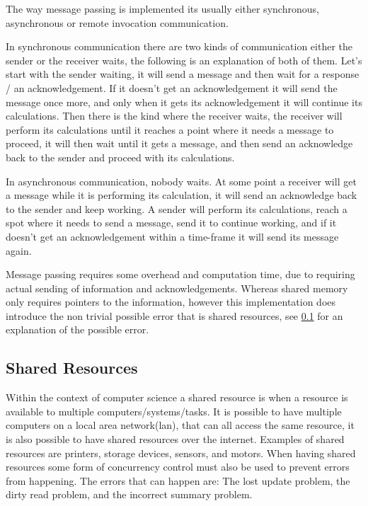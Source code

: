 The way message passing is implemented its usually either synchronous, asynchronous or remote invocation communication. 

In synchronous communication there are two kinds of communication either the sender or the receiver waits, the following is an explanation of both of them.
Let's start with the sender waiting, it will send a message and then wait for a response / an acknowledgement. If it doesn't get an acknowledgement it will send the message once more, and only when it gets its acknowledgement it will continue its calculations. 
Then there is the kind where the receiver waits, the receiver will perform its calculations until it reaches a point where it needs a message to proceed, it will then wait until it gets a message, and then send an acknowledge back to the sender and proceed with its calculations. 

In asynchronous communication, nobody waits. At some point a receiver will get a message while it is performing its calculation, it will send an acknowledge back to the sender and keep working. A sender will perform its calculations, reach a spot where it needs to send a message, send it to continue working, and if it doesn't get an acknowledgement within a time-frame it will send its message again.

Message passing requires some overhead and computation time, due to requiring actual sending of information and acknowledgements. Whereas shared memory only requires pointers to the information, however this implementation does introduce the non trivial possible error that is shared resources, see \ref{sharedReources} for an explanation of the possible error.



\subsection{\textbf{Shared Resources}}\label{sharedReources}
Within the context of computer science a shared resource is when a resource is available to multiple computers/systems/tasks. It is possible to have multiple computers on a local area network(lan), that can all access the same resource, it is also possible to have shared resources over the internet. Examples of shared resources are printers, storage devices, sensors, and motors.
When having shared resources some form of concurrency control must also be used to prevent errors from happening. The errors that can happen are: The lost update problem, the dirty read problem, and the incorrect summary problem.

